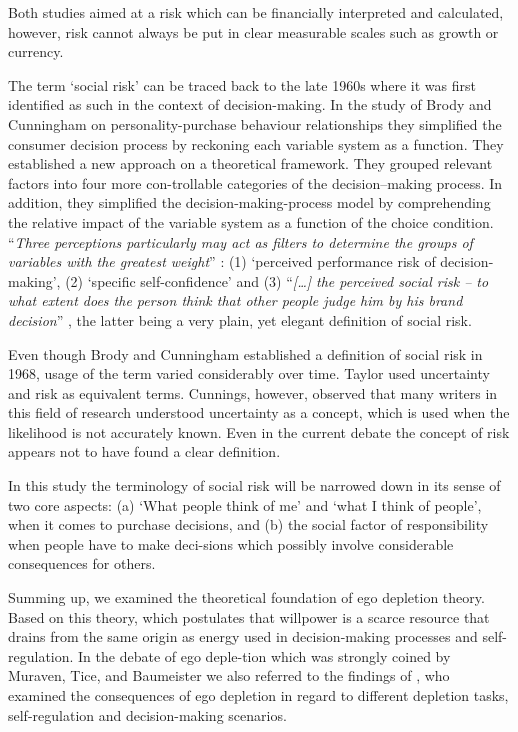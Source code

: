Both studies aimed at a risk which can be financially interpreted and calculated, however, risk cannot always be put in clear measurable scales such as growth or currency.\par
The term ‘social risk’ can be traced back to the late 1960s where it was first identified as such in the context of decision-making. In the study of Brody and Cunningham \citep{brody1968personality} on personality-purchase behaviour relationships they simplified the consumer decision process by reckoning each variable system as a function. They established a new approach on a theoretical framework. They grouped relevant factors into four more con-trollable categories of the decision–making process.  In addition, they simplified the decision-making-process model by comprehending the relative impact of the variable system as a function of the choice condition. “\emph{Three perceptions particularly may act as filters to determine the groups of variables with the greatest weight}” \citep{brody1968personality}: (1) ‘perceived performance risk of decision-making’, (2) ‘specific self-confidence’ and (3) “\emph{[\ldots] the perceived social risk – to what extent does the person think that other people judge him by his brand decision}” \citep[p.~51]{brody1968personality}, the latter being a very plain, yet elegant definition of social risk.\par
Even though Brody and Cunningham established a definition of social risk in 1968, usage of the term varied considerably over time. Taylor \citep{taylor1974role} used uncertainty and risk as equivalent terms. Cunnings, however, observed that many writers in this field of research understood uncertainty as a concept, which is used when the likelihood is not accurately known. Even in the current debate the concept of risk appears not to have found a clear definition.\par
In this study the terminology of social risk will be narrowed down in its sense of two core aspects: (a) ‘What people think of me’ and ‘what I think of people’, when it comes to purchase decisions, and (b) the social factor of responsibility when people have to make deci-sions which possibly involve considerable consequences for others.\par
Summing up, we examined the theoretical foundation of ego depletion theory. Based on this theory, which postulates that willpower is a scarce resource that drains from the same origin as energy used in decision-making processes and self-regulation. In the debate of ego deple-tion which was strongly coined by Muraven, Tice, and Baumeister we also referred to the findings of \citep{vohs2000self,pocheptsova2009deciding,bruyneel2009felt}, who examined the consequences of ego depletion in regard to different depletion tasks, self-regulation and decision-making scenarios.\par
